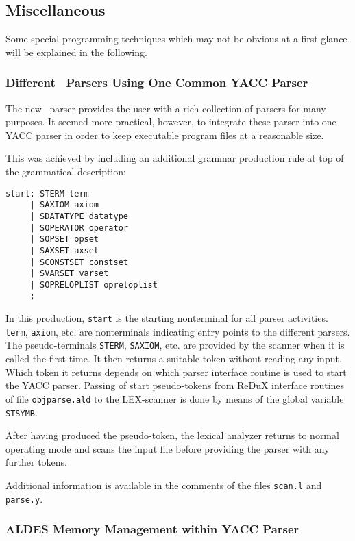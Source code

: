 \subsection{Miscellaneous}

Some special programming techniques which may not be obvious at a
first glance will be explained in the following.

\subsubsection{Different \redux\ Parsers Using One Common YACC Parser}
The new \redux\ parser provides the user with a rich collection of
parsers for many purposes. It seemed more practical, however, to
integrate these parser into one YACC parser in order to keep executable
program files at a reasonable size.

This was achieved by including an additional grammar production rule at top
of the grammatical description:
\begin{verbatim}
start: STERM term
     | SAXIOM axiom
     | SDATATYPE datatype
     | SOPERATOR operator
     | SOPSET opset
     | SAXSET axset
     | SCONSTSET constset
     | SVARSET varset
     | SOPRELOPLIST opreloplist
     ;
\end{verbatim}
In this production, {\tt start} is the starting nonterminal for all
parser activities. {\tt term}, {\tt axiom}, etc. are nonterminals
indicating entry points to the different parsers. The pseudo-terminals
{\tt STERM}, {\tt SAXIOM}, etc. are provided by the scanner when it
is called the first time. It then returns a suitable token without
reading any input. Which token it returns depends on which parser
interface routine is used to start the YACC parser. Passing of
start pseudo-tokens from ReDuX interface routines of file {\tt objparse.ald}
to the LEX-scanner is done by means of the global variable
{\tt STSYMB}.

After having produced the pseudo-token, the lexical analyzer returns
to normal operating mode and scans the input file before providing
the parser with any further tokens.

Additional information is available in the comments of the files {\tt scan.l}
and {\tt parse.y}.

\subsubsection{ALDES Memory Management within YACC Parser}


